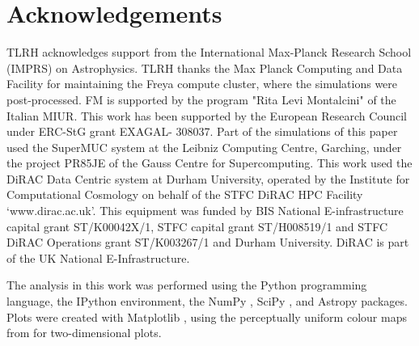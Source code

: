 \documentclass[a4paper,fleqn,usenatbib]{mnras}
\begin{document}
\section*{Acknowledgements}
TLRH acknowledges support from the International Max-Planck Research School (IMPRS)
on Astrophysics. TLRH thanks the Max Planck Computing and Data Facility for
maintaining the Freya compute cluster, where the simulations were post-processed.
FM is supported by the program "Rita Levi Montalcini" of the Italian MIUR.
This work has been supported by the European Research Council under ERC-StG grant
EXAGAL- 308037. Part of the simulations of this paper used the SuperMUC system 
at the Leibniz Computing Centre, Garching, under the project PR85JE of the Gauss 
Centre for Supercomputing. This work used the DiRAC Data Centric system at Durham
University, operated by the Institute for Computational Cosmology on behalf of
the STFC DiRAC HPC Facility `www.dirac.ac.uk'. This equipment was funded by BIS 
National E-infrastructure capital grant ST/K00042X/1, STFC capital grant 
ST/H008519/1 and STFC DiRAC Operations grant ST/K003267/1 and Durham University.
DiRAC is part of the UK National E-Infrastructure.


The analysis in this work was performed using the Python \citep{python}
programming language, the IPython \citep{2007CSE.....9c..21P} environment, 
the NumPy \citep{2011CSE....13b..22V}, SciPy \citep{scipy}, and Astropy 
\citep{2013A&A...558A..33A} packages. Plots were created with Matplotlib 
\citep{2007CSE.....9...90H}, using the perceptually uniform colour maps
from \citet{2015arXiv150903700K} for two-dimensional plots.







 


\end{document}
